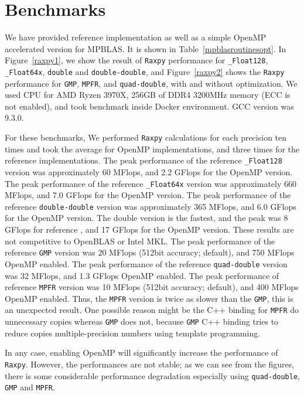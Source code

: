 \documentclass[12pt]{article}
\begin{document}
\section{Benchmarks}
\label{sec:benchmarks}
We have provided reference implementation as well as a simple OpenMP accelerated version for MPBLAS. It is shown in Table~\ref{mpblasroutinesopt}.
In Figure~\ref{raxpy1}, we show the result of {\tt Raxpy} performance for {\tt \_Float128}, {\tt \_Float64x}, {\tt double} and  {\tt double-double},
 and Figure~\ref{raxpy2} shows the {\tt Raxpy} performance for {\tt GMP}, {\tt MPFR}, and {\tt quad-double}, with and without optimization. We used CPU for AMD Ryzen 3970X, 256GB of DDR4 3200MHz memory (ECC is not enabled), and took benchmark inside Docker environment. GCC version was 9.3.0.
 
For these benchmarks, We performed {\tt Raxpy} calculations for each precision ten times and took the average for OpenMP implementations, and three times for the reference implementations. The peak performance of the reference {\tt \_Float128} version was approximately 60 MFlops, and 2.2 GFlops for the OpenMP version. The peak performance of the reference {\tt \_Float64x} version was approximately 660 MFlops, and 7.0 GFlops for the OpenMP version. The peak performance of the reference {\tt double-double} version was approximately 365 MFlops, and 6.0 GFlops for the OpenMP version. The double version is the fastest, and the peak was 8 GFlops for reference , and 17 GFlops for the OpenMP version. These results are not competitive to OpenBLAS or Intel MKL. 
The peak performance of the reference {\tt GMP} version was 20 MFlops (512bit accuracy; default), and 750 MFlops OpenMP enabled.
The peak performance of the reference {\tt quad-double} version was 32 MFlops, and 1.3 GFlops OpenMP enabled.
The peak performance of reference {\tt MPFR} version was 10 MFlops (512bit accuracy; default), and 400 MFlops OpenMP enabled.
Thus, the {\tt MPFR} version is twice as slower than the {\tt GMP}, this is an unexpected result. One possible reason might be the C++ binding
for {\tt MPFR} do unnecessary copies whereas {\tt GMP} does not, because {\tt GMP} C++ binding tries to reduce copies multiple-precision numbers using template programming.

In any case, enabling OpenMP will significantly increase the performance of {\tt Raxpy}. However, the performances are not stable; as we can see from the figures, there is some considerable performance degradation especially using {\tt quad-double}, {\tt GMP} and {\tt MPFR}.
\end{document}
